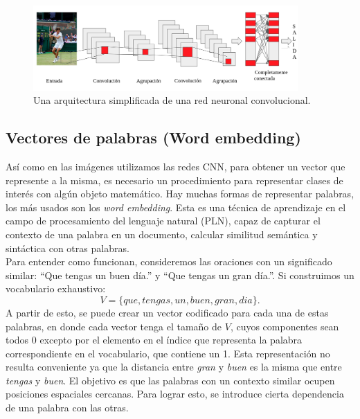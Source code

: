 \begin{figure}
	\centering
	\includegraphics[width=0.9\textwidth]{img/red_cnn.png}
	\caption{Una arquitectura simplificada de una red neuronal convolucional.}
	\label{fig:CNNEjemplo}
\end{figure}

\subsection{Vectores de palabras (Word embedding)} \label{sec:wordembedding}
Así como en las imágenes utilizamos las redes CNN, para obtener un vector que represente a la misma, es necesario un procedimiento para representar clases de interés con algún objeto matemático. Hay muchas formas de representar palabras, los más usados son los \textit{word embedding}. Esta es una técnica de aprendizaje en el campo de procesamiento del lenguaje natural (PLN), capaz de capturar el contexto de una palabra en un documento, calcular similitud semántica y sintáctica con otras palabras.\\

Para entender como funcionan, consideremos las oraciones con un significado similar: ``Que tengas un buen día.'' y ``Que tengas un gran día.''. Si construimos un vocabulario exhaustivo:
\[ V = \{que, tengas, un, buen, gran, dia\}. \]
A partir de esto, se puede crear un vector codificado para cada una de estas palabras, en donde cada vector tenga el tamaño de $V$, cuyos componentes sean todos 0 excepto por el elemento en el índice que representa la palabra correspondiente en el vocabulario, que contiene un 1. Esta representación no resulta conveniente ya que la distancia entre \textit{gran} y \textit{buen} es la misma que entre \textit{tengas} y \textit{buen}.  El objetivo es que las palabras con un contexto similar ocupen posiciones espaciales cercanas. Para lograr esto, se introduce cierta dependencia de una palabra con las otras.\\

